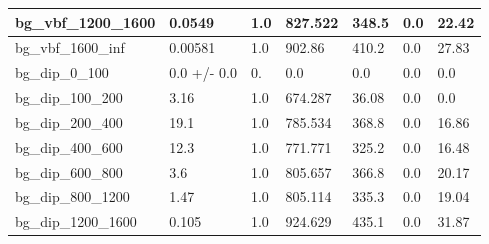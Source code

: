 \documentclass[a4paper, 10pt]{article}
\begin{document}
\begin{table}[H]
\begin{center}
\begin{tabular}{|m{23.0mm}|m{23.0mm}|m{18.0mm}|m{19.0mm}|m{19.0mm}|m{19.0mm}|m{19.0mm}|}
      \hline
      {\cellcolor{white}         bg\_vbf\_1200\_1600}& {\cellcolor{white}         0.0549}& {\cellcolor{white}         1.0}& {\cellcolor{white}         827.522}& {\cellcolor{white}         348.5}& {\cellcolor{red}         0.0}& {\cellcolor{red}         22.42}\\
      \hline
      {\cellcolor{white}         bg\_vbf\_1600\_inf}& {\cellcolor{white}         0.00581}& {\cellcolor{white}         1.0}& {\cellcolor{white}         902.86}& {\cellcolor{white}         410.2}& {\cellcolor{red}         0.0}& {\cellcolor{red}         27.83}\\
      \hline
      {\cellcolor{white}         bg\_dip\_0\_100}& {\cellcolor{white}         0.0 +/\-- 0.0}& {\cellcolor{white}         0.}& {\cellcolor{white}         0.0}& {\cellcolor{white}         0.0}& {\cellcolor{green}         0.0}& {\cellcolor{green}         0.0}\\
      \hline
      {\cellcolor{white}         bg\_dip\_100\_200}& {\cellcolor{white}         3.16}& {\cellcolor{white}         1.0}& {\cellcolor{white}         674.287}& {\cellcolor{white}         36.08}& {\cellcolor{green}         0.0}& {\cellcolor{green}         0.0}\\
      \hline
      {\cellcolor{white}         bg\_dip\_200\_400}& {\cellcolor{white}         19.1}& {\cellcolor{white}         1.0}& {\cellcolor{white}         785.534}& {\cellcolor{white}         368.8}& {\cellcolor{red}         0.0}& {\cellcolor{red}         16.86}\\
      \hline
      {\cellcolor{white}         bg\_dip\_400\_600}& {\cellcolor{white}         12.3}& {\cellcolor{white}         1.0}& {\cellcolor{white}         771.771}& {\cellcolor{white}         325.2}& {\cellcolor{red}         0.0}& {\cellcolor{red}         16.48}\\
      \hline
      {\cellcolor{white}         bg\_dip\_600\_800}& {\cellcolor{white}         3.6}& {\cellcolor{white}         1.0}& {\cellcolor{white}         805.657}& {\cellcolor{white}         366.8}& {\cellcolor{red}         0.0}& {\cellcolor{red}         20.17}\\
      \hline
      {\cellcolor{white}         bg\_dip\_800\_1200}& {\cellcolor{white}         1.47}& {\cellcolor{white}         1.0}& {\cellcolor{white}         805.114}& {\cellcolor{white}         335.3}& {\cellcolor{red}         0.0}& {\cellcolor{red}         19.04}\\
      \hline
      {\cellcolor{white}         bg\_dip\_1200\_1600}& {\cellcolor{white}         0.105}& {\cellcolor{white}         1.0}& {\cellcolor{white}         924.629}& {\cellcolor{white}         435.1}& {\cellcolor{red}         0.0}& {\cellcolor{red}         31.87}\\

\end{tabular}
\end{center}
\end{table}
\end{document}
